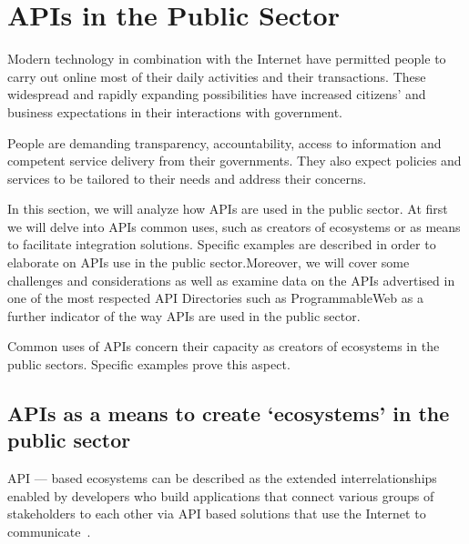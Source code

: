 
\chapter{APIs in the Public Sector}

\ifpdf
    \graphicspath{{Chapter2/Figs/Raster/}{Chapter2/Figs/PDF/}{Chapter2/Figs/}}
\else
    \graphicspath{{Chapter2/Figs/Vector/}{Chapter2/Figs/}}
\fi

Modern technology in combination with the Internet have permitted people
to carry out online most of their daily activities and their transactions.
These widespread and rapidly expanding possibilities have increased citizens'
and business expectations in their interactions with government.

People are demanding transparency, accountability, access to information and
competent service delivery from their governments. They also expect policies
and services to be tailored to their needs and address their concerns.

In this section, we will analyze how APIs are used in the public sector.
At first we will delve into APIs common uses, such as creators of ecosystems
or as means to facilitate integration solutions.
Specific examples are described in order to elaborate on APIs use in the public
sector.Moreover, we will
cover some challenges and considerations as well as examine data on the APIs
advertised in one of the most respected API Directories such as
ProgrammableWeb as a further indicator of the way APIs are used in the
public sector.


Common uses of APIs concern their capacity as creators of ecosystems
in the public sectors. Specific examples prove this aspect.


\section{APIs as a means to create ‘ecosystems’ in the public sector}

API — based ecosystems can be described as the extended interrelationships enabled
by developers who build applications that connect various groups of stakeholders
to each other via API based solutions that use the Internet to communicate~\citep{api_ecosystems}.


